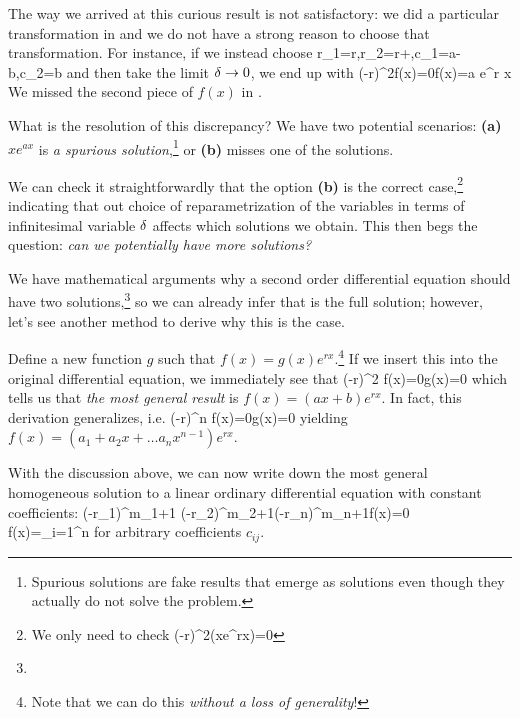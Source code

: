 The way we arrived at this curious result is not satisfactory: we did a particular transformation in  and we do not have a strong reason to choose that transformation. For instance, if we instead choose
\be 
\label{eq: repeated root transformation 2}
r_1=r\;,\quad r_2=r+\de\;,\quad c_1=a-b\;,\quad c_2=b
\ee 
and then take the limit $\delta\to0$, we end up with
\be 
\label{eq: repeated result 2}
\left(-r\right)^2f(x)=0\quad{}\quad f(x)=a e^{r x}
\ee 
We missed the second piece of $f(x)$ in .

What is the resolution of this discrepancy? We have two potential scenarios: \textbf{(a)} $x e^{ax}$ is \emph{a spurious solution},\footnote{Spurious solutions are fake results that emerge as solutions even though they actually do not solve the problem.} or \textbf{(b)}  misses one of the solutions.

We can check it straightforwardly that the option \textbf{(b)} is the correct case,\footnote{
We only need to check
\be 
\left(-r\right)^2(xe^{rx})=0
\ee 
} indicating that out choice of reparametrization of the variables in terms of infinitesimal variable $\delta$ affects which solutions we obtain. This then begs the question: \emph{can we potentially have more solutions?}

We have mathematical arguments why a second order differential equation should have two solutions,\footnote{} so we can already infer that  is the full solution; however, let's see another method to derive why this is the case.

Define a new function $g$ such that $f(x)=g(x)e^{rx}$.\footnote{Note that we can do this \emph{without a loss of generality}!} If we insert this into the original differential equation, we immediately see that
\be 
\left(-r\right)^2 f(x)=0\quad{}\quad {}g(x)=0
\ee 
which tells us that \emph{the most general result} is $f(x)=(ax+b)e^{rx}$. In fact, this derivation generalizes, i.e.
\be 
\left(-r\right)^n f(x)=0\quad{}\quad {}g(x)=0
\ee
yielding $f(x)=(a_1+a_2 x+\dots a_n x^{n-1})e^{rx}$.

With the discussion above, we can now write down the most general homogeneous solution to a linear ordinary differential equation with constant coefficients:
\bea
\left(-r_1\right)^{m_1+1} \left(-r_2\right)^{m_2+1}\cdots \left(-r_n\right)^{m_n+1}f(x)=0\\
\Rightarrow\qquad f(x)=\sum\limits_{i=1}^n\left[\left(\sum\limits_{k=0}^m c_{ik} x^k\right)e^{r_i x}\right]
\eea 
for arbitrary coefficients $c_{ij}$.


